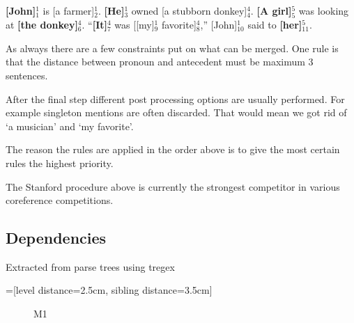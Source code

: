 \documentclass[12pt]{article}
\begin{document}
\begin{description}
\textbf{[John]$_1^1$} is [a farmer]$_2^1$. \textbf{[He]$_3^1$} owned [a stubborn donkey]$_4^4$.\newline
\textbf{[A girl]$_5^5$} was looking at \textbf{[the donkey]$_6^4$}.\newline
``\textbf{[It]$_7^4$} was [[my]$_9^1$ favorite]$_8^4$,'' [John]$_{10}^1$ said to \textbf{[her]$_{11}^{5}$}.

As always there are a few constraints put on what can be merged. One rule is that the distance between pronoun and antecedent must be maximum 3 sentences.
\end{description}

After the final step different post processing options are usually performed. For example singleton mentions are often discarded. That would mean we got rid of `a musician' and `my favorite'.

The reason the rules are applied in the order above is to give the most certain rules the highest priority.

The Stanford procedure above is currently the strongest competitor in various coreference competitions.

\subsection{Dependencies}

Extracted from parse trees using tregex\cite{de2006generating}

=[level distance=2.5cm, sibling distance=3.5cm]
\begin{figure}
\centering
{}
\caption{M1} \label{fig:M1}
\end{figure}
\end{document}
